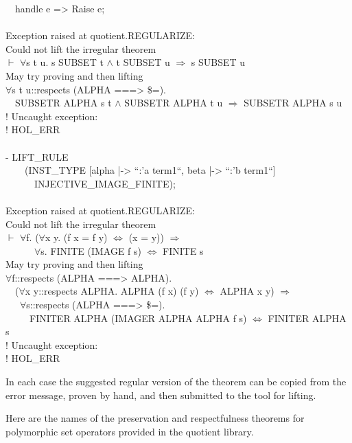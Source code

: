 \documentclass[envcountsame,runningheads]{llncs}
\begin{document}
{\begin{tabbing}
\ \ handle e => Raise e;  \\
  \\
Exception raised at quotient.REGULARIZE:  \\
Could not lift the irregular theorem  \\
$\vdash$ $\forall$s t u. s SUBSET t $\wedge$ t SUBSET u $\Rightarrow$ s SUBSET u  \\
May try proving and then lifting  \\
$\forall$s t u::respects (ALPHA ===> \$=).  \\
\ \ SUBSETR ALPHA s t $\wedge$ SUBSETR ALPHA t u $\Rightarrow$ SUBSETR ALPHA s u  \\
! Uncaught exception:   \\
! HOL\_ERR  \\
  \\
- LIFT\_RULE  \\
\ \ \ \ (INST\_TYPE [alpha |-> ``:'a term1``, beta |-> ``:'b term1``]  \\
\ \ \ \ \ \        INJECTIVE\_IMAGE\_FINITE);  \\
  \\
Exception raised at quotient.REGULARIZE:  \\
Could not lift the irregular theorem  \\
$\vdash$ $\forall$f.  
        ($\forall$x y. (f x = f y) $\Leftrightarrow$ (x = y)) $\Rightarrow$  \\
\ \ \ \ \ \ $\forall$s. FINITE (IMAGE f s) $\Leftrightarrow$ FINITE s  \\
May try proving and then lifting  \\
$\forall$f::respects (ALPHA ===> ALPHA).  \\
\ \ ($\forall$x y::respects ALPHA. ALPHA (f x) (f y) $\Leftrightarrow$ ALPHA x y) $\Rightarrow$  \\
\ \ \ $\forall$s::respects (ALPHA ===> \$=).  \\
\ \ \ \ \ FINITER ALPHA (IMAGER ALPHA ALPHA f s) $\Leftrightarrow$ FINITER ALPHA s  \\
! Uncaught exception:   \\
! HOL\_ERR  
\end{tabbing}}

In each case the suggested regular version of the theorem can be 
copied from the error message,
proven by hand, and then submitted to the tool for lifting.

Here are the names of the preservation and respectfulness theorems
for polymorphic set operators provided in the quotient library.
\end{document}
